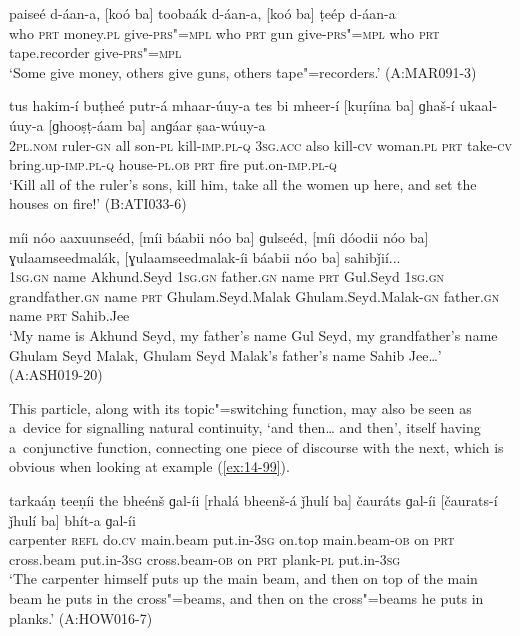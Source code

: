 \begin{exe}
\ex
\label{ex:14-96}
\gll [koó ba] paiseé d-áan-a, [koó ba] toobaák  d-áan-a, [koó ba] ṭeép d-áan-a \\
who \textsc{prt} money.\textsc{pl} give-\textsc{prs"=mpl} who \textsc{prt} gun  give-\textsc{prs"=mpl} who \textsc{prt} tape.recorder give-\textsc{prs"=mpl} \\
\glt `Some give money, others give guns, others tape"=recorders.' (A:MAR091-3)

\ex
\label{ex:14-97}
\gll tus hakim-í buṭheé putr-á mhaar-úuy-a tes  bi  mheer-í [kuṛíina ba]
ɡhaš-í ukaal-úuy-a  [ɡhooṣṭ-áam ba] anɡáar ṣaa-wúuy-a \\
\textsc{2pl.nom} ruler-\textsc{gn} all son-\textsc{pl} kill-\textsc{imp.pl-q} \textsc{3sg.acc} also  kill-\textsc{cv} woman.\textsc{pl} \textsc{prt} take-\textsc{cv} bring.up-\textsc{imp.pl-q}  house-\textsc{pl.ob} \textsc{prt} fire put.on-\textsc{imp.pl-q } \\
\glt `Kill all of the ruler's sons, kill him, take all the women up here, and set the houses on fire!' (B:ATI033-6)

\ex
\label{ex:14-98}
\gll míi nóo aaxuunseéd, [míi báabii nóo ba]  ɡulseéd, [míi
  dóodii nóo ba] ɣulaamseedmalák, [ɣulaamseedmalak-íi báabii nóo ba] sahibǰií... \\
\textsc{1sg.gn} name Akhund.Seyd \textsc{1sg.gn} father.\textsc{gn} name \textsc{prt}  Gul.Seyd \textsc{1sg.gn} grandfather.\textsc{gn} name \textsc{prt} Ghulam.Seyd.Malak Ghulam.Seyd.Malak-\textsc{gn} father.\textsc{gn} name \textsc{prt} Sahib.Jee  \\
\glt `My name is Akhund Seyd, my father's name Gul Seyd, my grandfather's name Ghulam Seyd Malak, Ghulam Seyd Malak's father's name Sahib Jee{\ldots}' (A:ASH019-20)
\end{exe}

This particle, along with its topic"=switching function, may also be seen as a~device for signalling natural continuity, `and then{\ldots} and then', itself having a~conjunctive function, connecting one piece of discourse with the next, which is obvious when looking at example (\ref{ex:14-99}).

\begin{exe}
\ex
\label{ex:14-99}
\gll tarkaáṇ teeṇíi the bheénš ɡal-íi  [rhalá bheenš-á ǰhulí ba] čauráts ɡal-íi  [čaurats-í ǰhulí ba] bhít-a ɡal-íi \\
carpenter \textsc{refl} do.\textsc{cv} main.beam put.in-\textsc{3sg }  on.top main.beam-\textsc{ob} on \textsc{prt} cross.beam put.in-\textsc{3sg}  cross.beam-\textsc{ob} on \textsc{prt} plank-\textsc{pl} put.in-\textsc{3sg} \\
\glt `The carpenter himself puts up the main beam, and then on top of the main beam he puts in the cross"=beams, and then on the cross"=beams he puts in planks.' (A:HOW016-7)
\end{exe}

